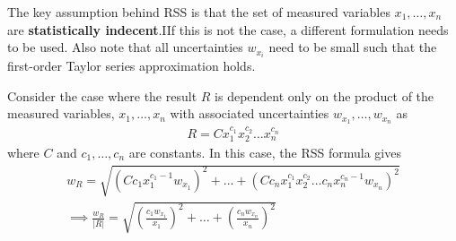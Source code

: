 The key assumption behind RSS is that the set of measured variables $x_1, \ldots, x_n$ are \textbf{statistically indecent}.IIf this is not the case, a different formulation needs to be used. Also note that all uncertainties $w_{x_i}$ need to be small such that the first-order Taylor series approximation holds. 

Consider the case where the result $R$ is dependent only on the product of the measured variables, $x_1, \ldots, x_n$ with associated uncertainties $w_{x_1}, \ldots, w_{x_n}$ as 
\begin{align*}
    R = C x_{1}^{c_1} x_{2}^{c_2} \ldots x_{n}^{c_n}
\end{align*}
where $C$ and $c_1, \ldots, c_n$ are constants. In this case, the RSS formula gives
\begin{align}
    w_{R} = \sqrt{\left(C c_1 x_{1}^{c_1 - 1} w_{x_1}\right)^2 + \ldots + \left(C c_n x_{1}^{c_1} x_{2}^{c_2} \ldots c_n x_{n}^{c_n - 1} w_{x_n}\right)^2} \nonumber \\
    \implies \frac{w_{R}}{|R|} = \sqrt{\left(\frac{c_1 w_{x_1}}{x_1}\right)^2 + \ldots + \left(\frac{c_n w_{x_n}}{x_n}\right)^2} \label{eq:error_propagation_pure_multiplicative}
\end{align}

